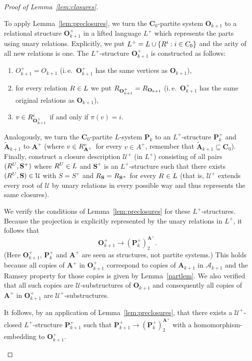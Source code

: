 \documentclass{elsarticle}
\newcommand{\ie}{i.\,e.}
\def\str#1{\mathbf {#1}}
\def\nbrel#1#2{R\ifstrempty{#1}{}{_{#1}}\ifstrempty{#2}{}{^{#2}}}
\def\rel#1#2{\nbrel{\ifstrempty{#1}{}{\str{#1}}}{#2}}
\theoremstyle{plain}
\theoremstyle{definition}
\theoremstyle{remark}
\begin{document}
\begin{proof}[Proof of Lemma~\ref{lem:closures}]
\begin{enumerate}
To apply Lemma~\ref{lem:preclosures}, we turn the $\str{C}_0$-partite system $\str{O}_{k+1}$ to a relational structure $\str{O}^+_{k+1}$ in a lifted language $L^+$ which represents the parts using unary relations. Explicitly, we put $L^+=L\cup \{\rel{}{i}:i\in C_0\}$ and the arity of all new relations is one. The $L^+$-structure $\str{O}^+_{k+1}$ is constructed as follows:
\begin{enumerate}
\item $O^+_{k+1}=O_{k+1}$ (\ie{}\ $\str{O}^+_{k+1}$ has the same vertices as $\str{O}_{k+1}$),
\item for every relation $\rel{}{}\in L$ we put $\nbrel{\str{O}^+_{k+1}}{}=\nbrel{\str{O}_{k+1}}{}$ (\ie{}\ $\str{O}^+_{k+1}$ has the same original relations as $\str{O}_{k+1}$),
\item $v\in \nbrel{\str{O}^+_{k+1}}{i}$ if and only if $\pi(v)=i$.
\end{enumerate}
Analogously, we turn the $\str{C}_0$-partite $L$-system $\str{P}_{k}$ to an $L^+$-structure $\str{P}^+_k$ and $\widetilde{\str{A}}_{k+1}$ to $\str{A}^+$ (where $v\in \nbrel{\str{A}^+}{v}$ for every $v\in A^+$, remember that $\widetilde{\str{A}}_{k+1}\subseteq \str C_0$). Finally, construct a closure description $\mathcal U^+$ (in $L^+$) consisting of all pairs $(\rel{}{U},\str{S}^+)$ where $\rel{}{U}\in L$ and $\str{S}^+$ is an $L^+$-structure such that there exists $(\rel{}{U},\str{S})\in \mathcal U$ with $S=S^+$ and $\nbrel{\str{S}}{}=\nbrel{\str{S}^+}{}$ for every $\rel{}{}\in L$ (that is, $\mathcal U^+$ extends every root of $\mathcal U$ by unary relations in every possible way and thus represents the same closures).

We verify the conditions of Lemma~\ref{lem:preclosures} for these $L^+$-structures. Because the projection is explicitly represented by the unary relations in $L^+$, it follows that $$\str{O}^+_{k+1} \longrightarrow (\str{P}^+_k)^{\str{A}^+}_2.$$ (Here $\str{O}^+_{k+1}$, $\str{P}^+_k$ and $\str{A}^+$ are seen as structures, not partite systems.)
This holds because all copies of $\str{A}^+$ in $\str{O}^+_{k+1}$ correspond to copies of $\str{A}_{k+1}$ in $\mathcal A_{k+1}$ and the Ramsey property for those copies is given by Lemma~\ref{partlem}. We also verified that all such copies are $\mathcal U$-substructures of $\str{O}_{k+1}$ and consequently all copies of $\str{A}^+$ in $\str{O}^+_{k+1}$ are $\mathcal U^+$-substructures.

It follows, by an application of Lemma~\ref{lem:preclosures}, that
there exists a $\mathcal U^+$-closed $L^+$-structure $\str{P}^+_{k+1}$ such that $\str{P}^+_{k+1} \longrightarrow (\str{P}^+_k)^{\str{A}^+}_2$
with a homomorphism-embedding to $\str{O}^+_{k+1}$. 


\end{enumerate}
\end{proof}
\end{document}
